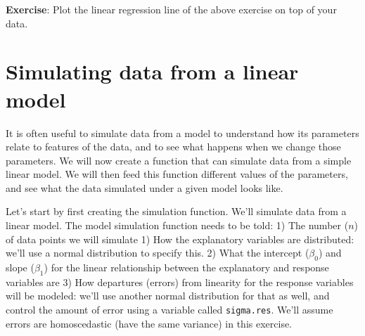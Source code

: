 \documentclass[
]{book}
\begin{document}
\textbf{Exercise}: Plot the linear regression line of the above exercise on top of your data.

\hypertarget{simulating-data-from-a-linear-model}{%
\section{Simulating data from a linear model}\label{simulating-data-from-a-linear-model}}

It is often useful to simulate data from a model to understand how its parameters relate to features of the data, and to see what happens when we change those parameters. We will now create a function that can simulate data from a simple linear model. We will then feed this function different values of the parameters, and see what the data simulated under a given model looks like.

Let's start by first creating the simulation function. We'll simulate data from a linear model. The model simulation function needs to be told:
1) The number (\(n\)) of data points we will simulate
1) How the explanatory variables are distributed: we'll use a normal distribution to specify this.
2) What the intercept (\(\beta_0\)) and slope (\(\beta_1\)) for the linear relationship between the explanatory and response variables are
3) How departures (errors) from linearity for the response variables will be modeled: we'll use another normal distribution for that as well, and control the amount of error using a variable called \texttt{sigma.res}. We'll assume errors are homoscedastic (have the same variance) in this exercise.
\end{document}

